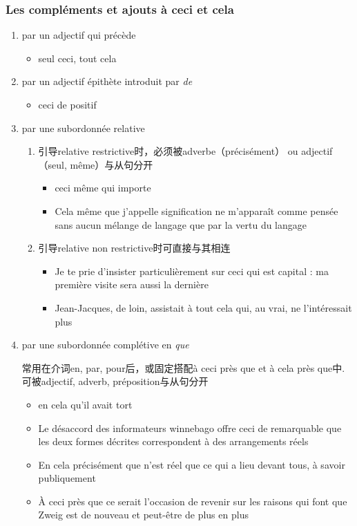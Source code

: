 \documentclass[UTF8]{report}
\begin{document}
\subsubsection{Les compléments et ajouts à ceci et cela}
\begin{enumerate}
    \item par un adjectif qui précède
    \begin{itemize}
        \item seul ceci, tout cela
    \end{itemize}
    \item par un adjectif épithète introduit par \textit{de}
    \begin{itemize}
        \item ceci de positif
    \end{itemize}
    \item par une subordonnée relative
    \begin{enumerate}
        \item 引导relative restrictive时，必须被adverbe（précisément） ou adjectif（seul, même）与从句分开
        \begin{itemize}
            \item ceci même qui importe
            \item Cela même que j’appelle signification ne m’apparaît comme pensée sans aucun mélange de langage que par la vertu du langage
        \end{itemize}
        \item 引导relative non restrictive时可直接与其相连
        \begin{itemize}
            \item Je te prie d’insister particulièrement sur ceci qui est capital : ma première visite sera aussi la dernière
            \item Jean-Jacques, de loin, assistait à tout cela qui, au vrai, ne l’intéressait plus
        \end{itemize}
    \end{enumerate}
    \item par une subordonnée complétive en \textit{que}
    
    常用在介词en, par, pour后，或固定搭配à ceci près que et à cela près que中. 可被adjectif, adverb, préposition与从句分开
    \begin{itemize}
        \item en cela qu’il avait tort
        \item Le désaccord des informateurs winnebago offre ceci de remarquable que les deux formes décrites correspondent à des arrangements réels
        \item En cela précisément que n’est réel que ce qui a lieu devant tous, à savoir publiquement
        \item À ceci près que ce serait l’occasion de revenir sur les raisons qui font que Zweig est de nouveau et peut-être de plus en plus
    \end{itemize}
\end{enumerate}
\end{document}
